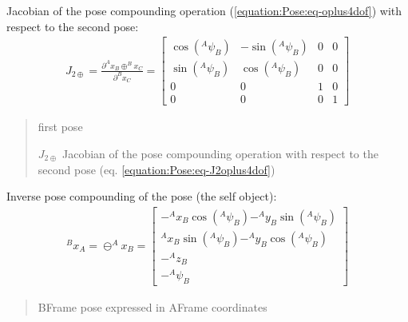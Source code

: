 \documentclass[letterpaper,10pt,english]{sphinxmanual}
\begin{document}
\begin{fulllineitems}
\begin{fulllineitems}
\label{\detokenize{Pose:Pose.Pose4D.J_2oplus}}
\pysigstartsignatures
{}
\pysigstopsignatures
\sphinxAtStartPar
Jacobian of the pose compounding operation (\eqref{equation:Pose:eq-oplus4dof}) with respect to the second pose:
\begin{equation}\label{equation:Pose:eq-J2oplus4dof}
\begin{split}J_{2\oplus}=\frac{\partial  ^Ax_B \oplus ^Bx_C}{\partial ^Bx_C} =
\begin{bmatrix}
    \cos(^A\psi_B) & -\sin(^A\psi_B) & 0 & 0 \\
    \sin(^A\psi_B) & \cos(^A\psi_B) & 0 & 0 \\
    0 & 0 & 1 & 0 \\
    0 & 0 & 0 & 1
\end{bmatrix}\end{split}
\end{equation}\begin{quote}\begin{description}
\sphinxAtStartPar
{} \textendash{} first pose

\sphinxAtStartPar
\(J_{2\oplus}\) Jacobian of the pose compounding operation with respect to the second pose (eq. \eqref{equation:Pose:eq-J2oplus4dof})

\end{description}\end{quote}

\end{fulllineitems}


\begin{fulllineitems}
\label{\detokenize{Pose:Pose.Pose4D.ominus}}
\pysigstartsignatures
{}
\pysigstopsignatures
\sphinxAtStartPar
Inverse pose compounding of the  pose (the self object):
\begin{equation}\label{equation:Pose:eq-ominus4dof}
\begin{split}^Bx_A = \ominus ^Ax_B =
\begin{bmatrix}
    -^Ax_B \cos(^A\psi_B) - ^Ay_B \sin(^A\psi_B) \\
    ^Ax_B \sin(^A\psi_B) - ^Ay_B \cos(^A\psi_B) \\
    -^Az_B \\
    -^A\psi_B
\end{bmatrix}\end{split}
\end{equation}\begin{quote}\begin{description}
\sphinxAtStartPar
{} \textendash{} B\sphinxhyphen{}Frame pose expressed in A\sphinxhyphen{}Frame coordinates


\end{description}
\end{quote}
\end{fulllineitems}
\end{fulllineitems}
\end{document}
